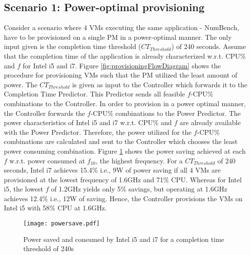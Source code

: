 \documentclass{sig-alternate}
\begin{document}
\subsection{Scenario 1: Power-optimal provisioning}
Consider a scenario where 4 VMs executing the same application - NumBench, have to be provisioned on a single PM in a power-optimal manner. The only input given is the completion time threshold ($CT_{Threshold}$) of 240 seconds. Assume that the completion time of the application is already characterized w.r.t. CPU\% and $f$ for Intel i5 and i7. Figure \ref{fig:provisioningFlowDiagram} shows the procedure for provisioning VMs such that the PM utilized the least amount of power. The $CT_{Threshold}$ is given as input to the Controller which forwards it to the Completion Time Predictor. This Predictor sends all feasible $f$-CPU\% combinations to the Controller. In order to provision in a power optimal manner, the Controller forwards the $f$-CPU\% combinations to the Power Predictor. The power characteristics of Intel i5 and i7 w.r.t. CPU\% and $f$ are already available with the Power Predictor. Therefore, the power utilized for the $f$-CPU\% combinations are calculated and sent to the Controller which chooses the least power consuming combination. Figure \ref{fig:powersave} shows the power saving achieved at each $f$ w.r.t. power consumed at $f_{10}$, the highest frequency. For a $CT_{Threshold}$ of 240 seconds, Intel i7 achieves 15.4\% i.e., 9W of power saving if all 4 VMs are provisioned at the lowest frequency of 1.6GHz and 71\% CPU. Whereas for Intel i5, the lowest $f$ of 1.2GHz yields only 5\% savings, but operating at 1.6GHz achieves 12.4\% i.e., 12W of saving. Hence, the Controller provisions the VMs on Intel i5 with 58\% CPU at 1.6GHz.

\begin{figure}[!htbp]
\centering
\vspace{-0.3cm}
\texttt{[image: powersave.pdf]}
\caption{Power saved and consumed by Intel i5 and i7 for a completion time threshold of 240s}
\label{fig:powersave}
 \vspace{-0.5cm}
\end{figure}
\end{document}
